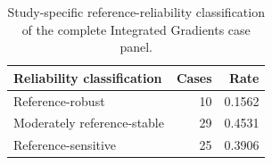 \begin{table}
\caption{Study-specific reference-reliability classification of the complete Integrated Gradients case panel.}
\label{tab:ig_reliability_distribution}
\begin{tabular}{lrr}
\toprule
Reliability classification & Cases & Rate \\
\midrule
Reference-robust & 10 & 0.1562 \\
Moderately reference-stable & 29 & 0.4531 \\
Reference-sensitive & 25 & 0.3906 \\
\bottomrule
\end{tabular}
\end{table}
